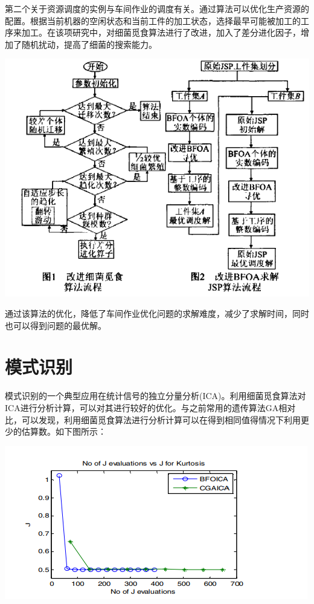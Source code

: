 \documentclass{article}
\begin{document}
第二个关于资源调度的实例与车间作业的调度有关。通过算法可以优化生产资源的配置。根据当前机器的空闲状态和当前工件的加工状态，选择最早可能被加工的工序来加工。在该项研究中，对细菌觅食算法进行了改进，加入了差分进化因子，增加了随机扰动，提高了细菌的搜索能力\cite{ref2}。
\vspace{1em}
\begin{center}
\includegraphics[scale=0.7]{images/flow1.png}
\end{center}
通过该算法的优化，降低了车间作业优化问题的求解难度，减少了求解时间，同时也可以得到问题的最优解。

\section{模式识别}
模式识别的一个典型应用在统计信号的独立分量分析(ICA)。利用细菌觅食算法对ICA进行分析计算，可以对其进行较好的优化。与之前常用的遗传算法GA相对比，可以发现，利用细菌觅食算法进行分析计算可以在得到相同值得情况下利用更少的估算数\cite{ref3}。如下图所示：

\begin{center}
\includegraphics[scale=1]{images/compare.png}
\end{center}
\end{document}
